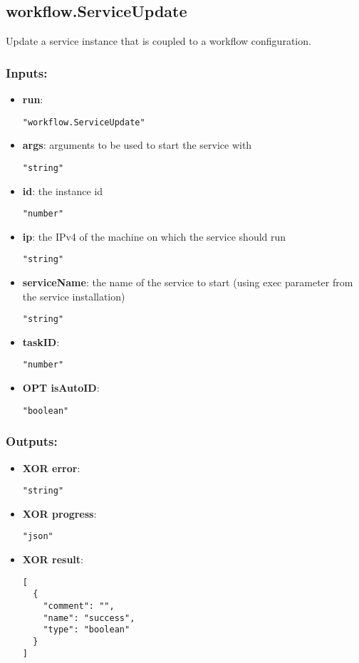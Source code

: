 \subsection{workflow.ServiceUpdate}
Update a service instance that is coupled to a workflow configuration.
\subsubsection*{Inputs:}
\begin{itemize}
    \item \textbf{run}: 
\begin{lstlisting}
"workflow.ServiceUpdate"
\end{lstlisting}
    \item \textbf{args}: arguments to be used to start the service with
\begin{lstlisting}
"string"
\end{lstlisting}
    \item \textbf{id}: the instance id
\begin{lstlisting}
"number"
\end{lstlisting}
    \item \textbf{ip}: the IPv4 of the machine on which the service should run
\begin{lstlisting}
"string"
\end{lstlisting}
    \item \textbf{serviceName}: the name of the service to start (using exec parameter from the service installation)
\begin{lstlisting}
"string"
\end{lstlisting}
    \item \textbf{taskID}: 
\begin{lstlisting}
"number"
\end{lstlisting}
    \item \textbf{OPT isAutoID}: 
\begin{lstlisting}
"boolean"
\end{lstlisting}
  \end{itemize}

\subsubsection*{Outputs:}
\begin{itemize}
    \item \textbf{XOR error}: 
\begin{lstlisting}
"string"
\end{lstlisting}
    \item \textbf{XOR progress}: 
\begin{lstlisting}
"json"
\end{lstlisting}
    \item \textbf{XOR result}: 
\begin{lstlisting}
[
  {
    "comment": "", 
    "name": "success", 
    "type": "boolean"
  }
]
\end{lstlisting}
  \end{itemize}

